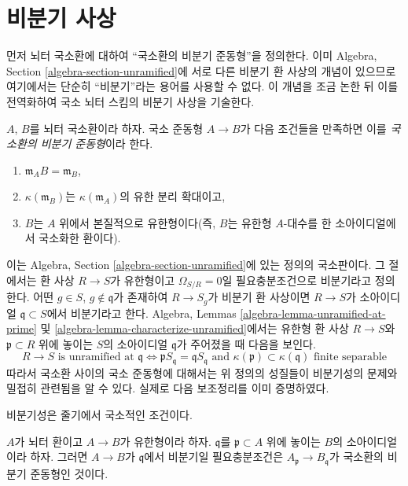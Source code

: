 \section{비분기 사상}
\label{section-unramified-definition}

\noindent
먼저 뇌터 국소환에 대하여 “국소환의 비분기 준동형”을 정의한다.
이미 Algebra, Section \ref{algebra-section-unramified}에 서로 다른
비분기 환 사상의 개념이 있으므로 여기에서는 단순히 “비분기”라는
용어를 사용할 수 없다. 이 개념을 조금 논한 뒤 이를 전역화하여
국소 뇌터 스킴의 비분기 사상을 기술한다.

\begin{definition}
\label{definition-unramified-rings}
$A$, $B$를 뇌터 국소환이라 하자. 국소 준동형 $A \to B$가 다음
조건들을 만족하면 이를 {\it 국소환의 비분기 준동형}이라 한다.
\begin{enumerate}
\item $\mathfrak m_AB = \mathfrak m_B$,
\item $\kappa(\mathfrak m_B)$는 $\kappa(\mathfrak m_A)$의 유한 분리 확대이고,
\item $B$는 $A$ 위에서 본질적으로 유한형이다(즉, $B$는 유한형
$A$-대수를 한 소아이디얼에서 국소화한 환이다).
\end{enumerate}
\end{definition}

\noindent
이는 Algebra, Section \ref{algebra-section-unramified}에 있는 정의의
국소판이다. 그 절에서는 환 사상 $R \to S$가 유한형이고
$\Omega_{S/R} = 0$일 필요충분조건으로 비분기라고 정의한다.
어떤 $g \in S$, $g \not \in \mathfrak q$가 존재하여
$R \to S_g$가 비분기 환 사상이면 $R \to S$가 소아이디얼
$\mathfrak q \subset S$에서 비분기라고 한다. Algebra, Lemmas
\ref{algebra-lemma-unramified-at-prime} 및
\ref{algebra-lemma-characterize-unramified}에서는 유한형 환 사상
$R \to S$와 $\mathfrak p \subset R$ 위에 놓이는 $S$의 소아이디얼
$\mathfrak q$가 주어졌을 때 다음을 보인다.
$$
R \to S\text{ is unramified at }\mathfrak q
\Leftrightarrow
\mathfrak pS_{\mathfrak q} = \mathfrak q S_{\mathfrak q}
\text{ and }
\kappa(\mathfrak p) \subset \kappa(\mathfrak q)\text{ finite separable}
$$
따라서 국소환 사이의 국소 준동형에 대해서는 위 정의의 성질들이
비분기성의 문제와 밀접히 관련됨을 알 수 있다. 실제로 다음 보조정리를
이미 증명하였다.

\begin{lemma}
\label{lemma-characterize-unramified-Noetherian}
\begin{slogan}
비분기성은 줄기에서 국소적인 조건이다.
\end{slogan}
$A$가 뇌터 환이고 $A \to B$가 유한형이라 하자.
$\mathfrak q$를 $\mathfrak p \subset A$ 위에 놓이는 $B$의
소아이디얼이라 하자. 그러면 $A \to B$가 $\mathfrak q$에서
비분기일 필요충분조건은 $A_{\mathfrak p} \to B_{\mathfrak q}$가
국소환의 비분기 준동형인 것이다.
\end{lemma}

